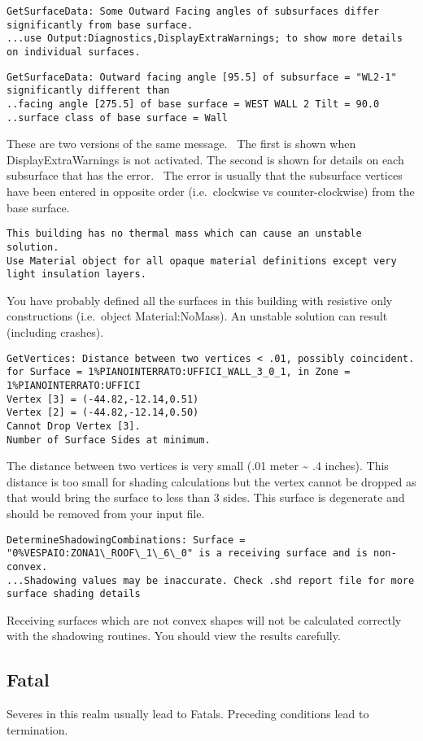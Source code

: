 \begin{lstlisting}
GetSurfaceData: Some Outward Facing angles of subsurfaces differ significantly from base surface.
...use Output:Diagnostics,DisplayExtraWarnings; to show more details on individual surfaces.
\end{lstlisting}

\begin{lstlisting}
GetSurfaceData: Outward facing angle [95.5] of subsurface = "WL2-1" significantly different than
..facing angle [275.5] of base surface = WEST WALL 2 Tilt = 90.0
..surface class of base surface = Wall
\end{lstlisting}

These are two versions of the same message.~ The first is shown when DisplayExtraWarnings is not activated. The second is shown for details on each subsurface that has the error.~ The error is usually that the subsurface vertices have been entered in opposite order (i.e.~clockwise vs counter-clockwise) from the base surface.

\begin{lstlisting}
This building has no thermal mass which can cause an unstable solution.
Use Material object for all opaque material definitions except very light insulation layers.
\end{lstlisting}

You have probably defined all the surfaces in this building with resistive only constructions (i.e.~object Material:NoMass). An unstable solution can result (including crashes).

\begin{lstlisting}
GetVertices: Distance between two vertices < .01, possibly coincident. for Surface = 1%PIANOINTERRATO:UFFICI_WALL_3_0_1, in Zone = 1%PIANOINTERRATO:UFFICI
Vertex [3] = (-44.82,-12.14,0.51)
Vertex [2] = (-44.82,-12.14,0.50)
Cannot Drop Vertex [3].
Number of Surface Sides at minimum.
\end{lstlisting}

The distance between two vertices is very small (.01 meter \textasciitilde{} .4 inches). This distance is too small for shading calculations but the vertex cannot be dropped as that would bring the surface to less than 3 sides. This surface is degenerate and should be removed from your input file.

\begin{lstlisting}
DetermineShadowingCombinations: Surface = "0%VESPAIO:ZONA1\_ROOF\_1\_6\_0" is a receiving surface and is non-convex.
...Shadowing values may be inaccurate. Check .shd report file for more surface shading details
\end{lstlisting}

Receiving surfaces which are not convex shapes will not be calculated correctly with the shadowing routines. You should view the results carefully.

\subsection{Fatal}\label{fatal-002}

Severes in this realm usually lead to Fatals. Preceding conditions lead to termination.
